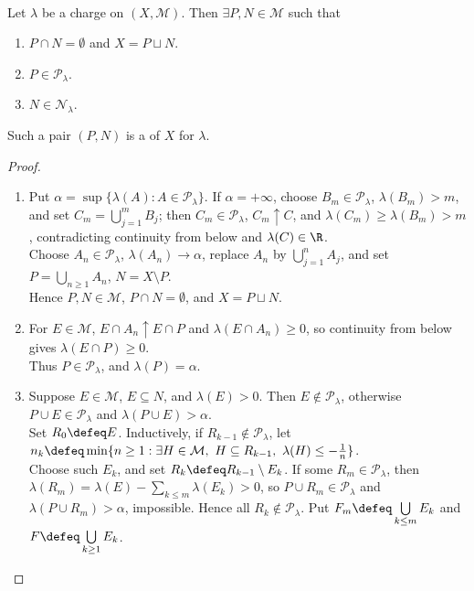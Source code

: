 \begin{theorem} \label{thm:hahn-decomposition-charge} \\
Let $\lambda$ be a charge on $(X,\mathcal{M})$. Then $\exists P,N\in\mathcal{M}$ such that
\begin{enumerate}[label=(\roman*)]
\setlength{\itemsep}{0pt}
\item $P\cap N=\emptyset$ and $X=P\sqcup N$.
\item $P\in\mathcal{P}_\lambda$.
\item $N\in\mathcal{N}_\lambda$.
\end{enumerate}
Such a pair $(P,N)$ is a  of $X$ for $\lambda$.
\begin{proof}
\begin{enumerate}[label=(\roman*)]
\setlength{\itemsep}{0pt}
\item Put $\alpha=\sup\{\lambda(A):A\in\mathcal{P}_\lambda\}$. If $\alpha=+\infty$, choose $B_m\in\mathcal{P}_\lambda$, $\lambda(B_m)>m$, and set $C_m=\bigcup\limits_{j=1}^{m}B_j$; then $C_m\in\mathcal{P}_\lambda$, $C_m\uparrow C$, and $\lambda(C_m)\geq\lambda(B_m)>m$, contradicting continuity from below and $\lambda(C)\in\R$.\\
Choose $A_n\in\mathcal{P}_\lambda$, $\lambda(A_n)\to\alpha$, replace $A_n$ by $\bigcup\limits_{j=1}^{n}A_j$, and set $P=\bigcup\limits_{n\geq1}A_n$, $N=X\setminus P$.\\
Hence $P,N\in\mathcal{M}$, $P\cap N=\emptyset$, and $X=P\sqcup N$.
\item For $E\in\mathcal{M}$, $E\cap A_n\uparrow E\cap P$ and $\lambda(E\cap A_n)\geq0$, so continuity from below gives $\lambda(E\cap P)\geq0$.\\
Thus $P\in\mathcal{P}_\lambda$, and $\lambda(P)=\alpha$.
\item Suppose $E\in\mathcal{M}$, $E\subseteq N$, and $\lambda(E)>0$. Then $E\notin\mathcal{P}_\lambda$, otherwise $P\cup E\in\mathcal{P}_\lambda$ and $\lambda(P\cup E)>\alpha$.\\
Set $R_0\defeq E$. Inductively, if $R_{k-1}\notin\mathcal{P}_\lambda$, let $n_k\defeq\min\{n\geq1:\exists H\in\mathcal{M},\ H\subseteq R_{k-1},\ \lambda(H)\leq-\frac{1}{n}\}$.\\
Choose such $E_k$, and set $R_k\defeq R_{k-1}\setminus E_k$. If some $R_m\in\mathcal{P}_\lambda$, then $\lambda(R_m)=\lambda(E)-\sum\limits_{k\leq m}\lambda(E_k)>0$, so $P\cup R_m\in\mathcal{P}_\lambda$ and $\lambda(P\cup R_m)>\alpha$, impossible. Hence all $R_k\notin\mathcal{P}_\lambda$. Put $F_m\defeq\bigcup\limits_{k\leq m}E_k$ and $F\defeq\bigcup\limits_{k\geq1}E_k$.\\

\end{enumerate}
\end{proof}
\end{theorem}
